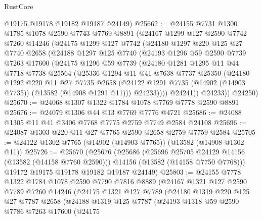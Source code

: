 \begin{lexlean}{RustCore}
\begin{coremodule}
      @19175
      @19178
      @19182
      @19187
      @24149)
@25662 := @24155
    @7731
    @1300
    @1785
    @1078
    @2590
    @7743
    @7769
    @8891
    (@24167
      @1299
      @127
      @2590
      @7742
      @7260
      @14246
      (@24175
        @1299
        @127
        @7742
        (@24180
          @1297
          @220
          @125
          @27
          @7740
          @2658
          (@24188
            @1297
            @125
            @7740
            (@24193
              @1296
              @59
              @2590
              @7739
              @7263
              @17600
              (@24175
                @1296
                @59
                @7739
                (@24180
                  @1281
                  @1295
                  @11
                  @44
                  @7718
                  @7738
                  @25564
                  (@25336
                    @1294
                    @11
                    @41
                    @7638
                    @7737
                    @25350
                    (@24180
                      @1292
                      @220
                      @11
                      @27
                      @7735
                      @2658
                      (@24122 @1291 @7735 (@14902 (@14903 @7735)) (@13582 (@14908 @1291 @11)))
                      @24233))))
              @24241))
          @24233))
      @24250)
@25670 := @24068 @1307 @1322 @1784 @1078 @7769 @7778 @2590 @8891
@25676 := @24079 @1306 @44 @13 @7769 @7776 @4721
@25686 := @24088 @1305 @11 @41 @3406 @7768 @7775 @2759 @7749 @2584 @24108
@25696 := @24087 @1303 @220 @11 @27 @7765 @2590 @2658 @2759 @7759 @2584
@25705 := @24122 @1302 @7765 (@14902 (@14903 @7765)) (@13582 (@14908 @1302 @11))
@25726 := @25670
    (@25676
      (@25686
        (@25696 @25705 @24129 @14156 (@13582 (@14158 @7760 @2590)))
        @14156
        (@13582 (@14158 @7750 @7768)))
      @19172
      @19175
      @19178
      @19182
      @19187
      @24149)
@25803 := @24155
    @7778
    @1322
    @1784
    @1078
    @2590
    @7790
    @7816
    @8889
    (@24167
      @1321
      @127
      @2590
      @7789
      @7260
      @14246
      (@24175
        @1321
        @127
        @7789
        (@24180
          @1319
          @220
          @125
          @27
          @7787
          @2658
          (@24188
            @1319
            @125
            @7787
            (@24193
              @1318
              @59
              @2590
              @7786
              @7263
              @17600
              (@24175

\end{coremodule}
\end{lexlean}
